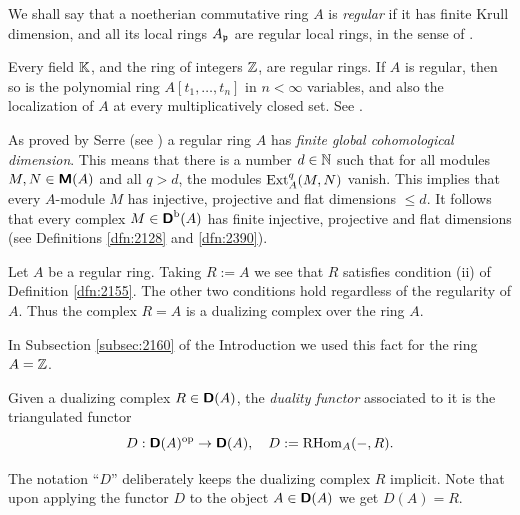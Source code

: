 \begin{dfn} \label{dfn:3075}
We shall say that a noetherian commutative ring $A$ is 
{\em regular}%
if it has 
finite Krull dimension, and all its local rings $A_{\mathfrak{p}}$ are regular local 
rings, in the sense of \cite{Mats}. 
\end{dfn}

Every field $\mathbb{K}$, and the ring of integers $\mathbb{Z}$, are regular rings. 
If $A$ is regular, then so is the polynomial ring 
$A[t_1, \ldots, t_n]$ in $n < \infty$ variables, and also the 
localization of $A$ at every multiplicatively closed set. See 
\cite[Chapter 7]{Mats}. 

As proved by Serre (see \cite[Theorem 19.2]{Mats}) a regular ring $A$ has 
{\em finite global cohomological dimension}. This means that there is a number 
$d \in \mathbb{N}$ such that for all modules $M, N \in \boldsymbol{\mathsf{M}}(A)$ and all 
$q > d$, the modules $\operatorname{Ext}^q_A(M, N)$ vanish. This implies that every
$A$-module $M$ has injective, projective and flat dimensions $\leq d$.
It follows that every complex 
$M \in \boldsymbol{\mathsf{D}}^{\mathrm{b}}(A)$ has finite injective, projective and flat 
dimensions (see Definitions \ref{dfn:2128} and \ref{dfn:2390}).  

\begin{exa} \label{exa:2171}
Let $A$ be a regular ring. Taking $R := A$ we see that $R$ satisfies condition 
(ii) of Definition \ref{dfn:2155}. The other two conditions hold regardless of 
the regularity of $A$. Thus the complex $R = A$ is a dualizing complex over the 
ring $A$. 

In  Subsection \ref{subsec:2160} of the Introduction we used this fact for 
the ring $A = \mathbb{Z}$. 
\end{exa}

\begin{dfn} \label{dfn:2156}
Given a dualizing complex $R \in \boldsymbol{\mathsf{D}}(A)$, the {\em duality functor}
associated to it is the triangulated functor 
\[ D : \boldsymbol{\mathsf{D}}(A)^{\mathrm{op}} \to \boldsymbol{\mathsf{D}}(A), \quad 
D := \operatorname{RHom}_A(-, R) .  \]
\end{dfn}

The notation ``$D$'' deliberately keeps the dualizing complex $R$ implicit. 
Note that upon applying the functor $D$ to the object $A \in \boldsymbol{\mathsf{D}}(A)$ we 
get $D(A) = R$. 

